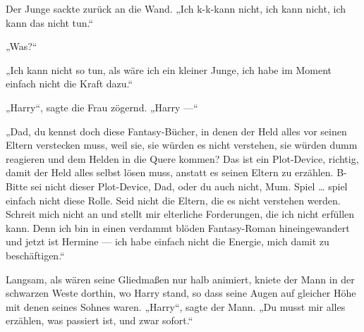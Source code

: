 Der Junge sackte zurück an die Wand.
„Ich k-k-kann nicht, ich kann nicht, ich kann das nicht tun.“

„Was?“

„Ich kann nicht so tun, als wäre ich ein kleiner Junge, ich habe im Moment einfach nicht die Kraft dazu.“

„Harry“, sagte die Frau zögernd.
„Harry —“

„Dad, du kennst doch diese Fantasy-Bücher, in denen der Held alles vor seinen Eltern verstecken muss, weil sie, sie würden es nicht verstehen, sie würden dumm reagieren und dem Helden in die Quere kommen? Das ist ein Plot-Device, richtig, damit der Held alles selbst lösen muss, anstatt es seinen Eltern zu erzählen. B-Bitte sei nicht dieser Plot-Device, Dad, oder du auch nicht, Mum. Spiel … spiel einfach nicht diese Rolle. Seid nicht die Eltern, die es nicht verstehen werden. Schreit mich nicht an und stellt mir elterliche Forderungen, die ich nicht erfüllen kann. Denn ich bin in einen verdammt blöden Fantasy-Roman hineingewandert und jetzt ist Hermine — ich habe einfach nicht die Energie, mich damit zu beschäftigen.“

Langsam, als wären seine Gliedmaßen nur halb animiert, kniete der Mann in der schwarzen Weste dorthin, wo Harry stand, so dass seine Augen auf gleicher Höhe mit denen seines Sohnes waren.
„Harry“, sagte der Mann.
„Du musst mir alles erzählen, was passiert ist, und zwar sofort.“

